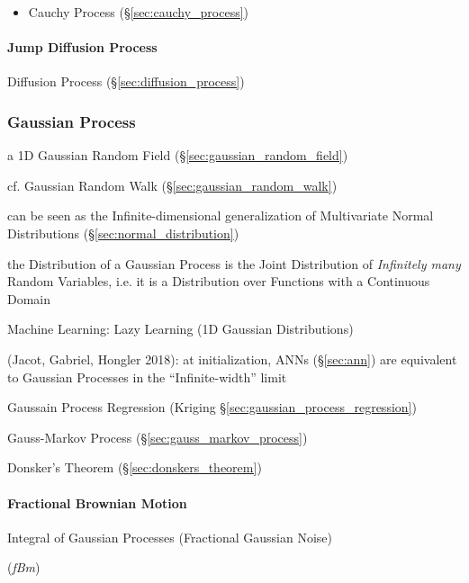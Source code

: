 \begin{itemize}
  \item Cauchy Process (\S\ref{sec:cauchy_process})
\end{itemize}



\paragraph{Jump Diffusion Process}\label{sec:jump_diffusion}\hfill

Diffusion Process (\S\ref{sec:diffusion_process})



\subsubsection{Gaussian Process}\label{sec:gaussian_process}

a 1D Gaussian Random Field (\S\ref{sec:gaussian_random_field})

cf. Gaussian Random Walk (\S\ref{sec:gaussian_random_walk})

can be seen as the Infinite-dimensional generalization of Multivariate Normal
Distributions (\S\ref{sec:normal_distribution})

the Distribution of a Gaussian Process is the Joint Distribution of
\emph{Infinitely many} Random Variables, i.e. it is a Distribution over
Functions with a Continuous Domain

Machine Learning: Lazy Learning (1D Gaussian Distributions)

(Jacot, Gabriel, Hongler 2018): at initialization, ANNs (\S\ref{sec:ann}) are
equivalent to Gaussian Processes in the ``Infinite-width'' limit

Gaussain Process Regression (Kriging \S\ref{sec:gaussian_process_regression})

\fist Gauss-Markov Process (\S\ref{sec:gauss_markov_process})

\fist Donsker's Theorem (\S\ref{sec:donskers_theorem})



\paragraph{Fractional Brownian Motion}\label{sec:fractional_brownian}\hfill

Integral of Gaussian Processes (Fractional Gaussian Noise)

(\emph{fBm})

